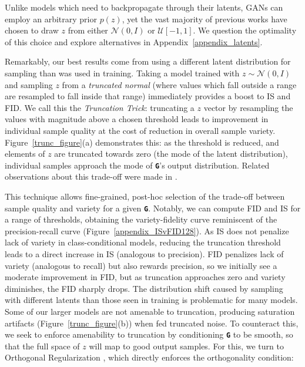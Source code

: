 \documentclass{article} %
\newcommand{\gen}{\textbf{\texttt{G}}}
\begin{document}
Unlike models which need to backpropagate through their latents, GANs can employ an arbitrary prior $p(z)$, yet the vast majority of previous works have chosen to draw $z$ from either $\mathcal{N}(0, I)$ or $\mathcal{U}[-1, 1]$. We question the optimality of this choice and explore alternatives in Appendix~\ref{appendix_latents}. 

Remarkably, our best results come from using a different latent distribution for sampling than was used in training. Taking a model trained with $z\sim\mathcal{N}(0, I)$ and sampling $z$ from a \textit{truncated normal} (where values which fall outside a range are resampled to fall inside that range) immediately provides a boost to IS and FID. We call this the \textit{Truncation Trick}: truncating a $z$ vector by resampling the values with magnitude above a chosen threshold leads to improvement in individual sample quality at the cost of reduction in overall sample variety. Figure~\ref{trunc_figure}(a) demonstrates this: as the threshold is reduced, and elements of $z$ are truncated towards zero (the mode of the latent distribution), individual samples approach the mode of \gen{}'s output distribution. Related observations about this trade-off were made in \citep{marchesi2017megapixel, pieters2018bachelors}.

This technique allows fine-grained, post-hoc selection of the trade-off between sample quality and variety for a given \gen{}. Notably, we can compute FID and IS for a range of thresholds, obtaining the variety-fidelity curve reminiscent of the precision-recall curve (Figure~\ref{appendix_ISvFID128}). As IS does not penalize lack of variety in class-conditional models, reducing the truncation threshold leads to a direct increase in IS (analogous to precision). FID penalizes lack of variety (analogous to recall) but also rewards precision, so we initially see a moderate improvement in FID, but as truncation approaches zero and variety diminishes, the FID sharply drops. The distribution shift caused by sampling with different latents than those seen in training is problematic for many models. Some of our larger models are not amenable to truncation, producing saturation artifacts (Figure~\ref{trunc_figure}(b)) when fed truncated noise. To counteract this, we seek to enforce amenability to truncation by conditioning \gen{} to be smooth, so that the full space of $z$ will map to good output samples. For this, we turn to Orthogonal Regularization \citep{brock2017photo}, which directly enforces the orthogonality condition:
\end{document}
